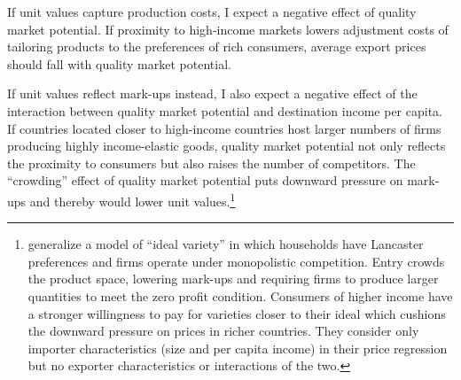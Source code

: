 \documentclass[12pt,a4paper,oneside,times]{article}   	%
\begin{document}
If unit values capture production costs, I expect a negative effect of quality market potential. If proximity to high-income markets lowers adjustment costs of tailoring products to the preferences of rich consumers, average export prices should fall with quality market potential.

If unit values reflect mark-ups instead, I also expect a negative effect of the interaction between quality market potential and destination income per capita. If countries located closer to high-income countries host larger numbers of firms producing highly income-elastic goods, quality market potential not only reflects the proximity to consumers but also raises the number of competitors. The ``crowding'' effect of quality market potential puts downward pressure on mark-ups and thereby would lower unit values.\footnote{\cite{Hummels2009} generalize a model of ``ideal variety'' in which households have Lancaster preferences and firms operate under monopolistic competition. Entry crowds the product space, lowering mark-ups and requiring firms to produce larger quantities to meet the zero profit condition. Consumers of higher income have a stronger willingness to pay for varieties closer to their ideal which cushions the downward pressure on prices in richer countries. They consider only importer characteristics (size and per capita income) in their price regression but no exporter characteristics or interactions of the two.} 


\end{document}
